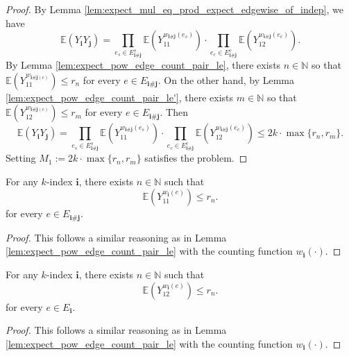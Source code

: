 \begin{proof}
  By Lemma \ref{lem:expect_mul_eq_prod_expect_edgewise_of_indep}, we have
  \[
  \mathbb{E} (Y_\mathbf{i}Y_\mathbf{j}) 
  = \prod_{e_s \in E^s_{\mathbf{i} \# \mathbf{j}}} \mathbb{E} (Y_{11}^{w_{\mathbf{i} \# \mathbf{j}}(e_s)}) \cdot \prod_{e_c \in E^c_{\mathbf{i} \# \mathbf{j}}} \mathbb{E} (Y_{12}^{w_{\mathbf{i} \# \mathbf{j}}(e_c)}).
  \]
  By Lemma \ref{lem:expect_pow_edge_count_pair_le}, there exists $n \in \mathbb{N}$ so that $\mathbb{E} (Y_{11}^{w_{\mathbf{i} \# \mathbf{j} (e)}}) \leq r_n$ for every $e \in E_{\mathbf{i} \# \mathbf{j}}$. 
  On the other hand, by Lemma \ref{lem:expect_pow_edge_count_pair_le'}, there exists $m \in \mathbb{N}$ so that $\mathbb{E} (Y_{12}^{w_{\mathbf{i} \# \mathbf{j} (e)}}) \leq r_m$ for every $e \in E_{\mathbf{i} \# \mathbf{j}}$. 
  Then
  \[ \mathbb{E} (Y_\mathbf{i}Y_\mathbf{j}) 
  = \prod_{e_s \in E^s_{\mathbf{i} \# \mathbf{j}}} \mathbb{E} (Y_{11}^{w_{\mathbf{i} \# \mathbf{j}}(e_s)}) \cdot \prod_{e_c \in E^c_{\mathbf{i} \# \mathbf{j}}} \mathbb{E} (Y_{12}^{w_{\mathbf{i} \# \mathbf{j}}(e_c)})
  \leq 2k \cdot \max\{r_n,r_m\}.
  \]
  Setting $M_1 := 2k \cdot \max\{r_n,r_m\}$ satisfies the problem.
\end{proof}
\begin{lemma}
  \notready
  \label{lem:expect_pow_edge_count_le} 
  For any $k$-index $\mathbf{i}$, there exists $n \in \mathbb{N}$ such that
  \[
  \mathbb{E} (Y_{11}^{w_{\mathbf{i}}(e)}) \leq r_n.
  \]
  for every $e \in E_{\mathbf{i} \# \mathbf{j}}$.
\end{lemma}
\begin{proof}
  This follows a similar reasoning as in Lemma \ref{lem:expect_pow_edge_count_pair_le} with the counting function $w_\mathbf{i}(\cdot)$.
\end{proof}
\begin{lemma}
  \notready
  \label{lem:expect_pow_edge_count_le'} 
  For any $k$-index $\mathbf{i}$, there exists $n \in \mathbb{N}$ such that
  \[
  \mathbb{E} (Y_{12}^{w_{\mathbf{i}}(e)}) \leq r_n.
  \]
  for every $e \in E_\mathbf{i}$.
\end{lemma}
\begin{proof}
  This follows a similar reasoning as in Lemma \ref{lem:expect_pow_edge_count_pair_le} with the counting function $w_\mathbf{i}(\cdot)$.
\end{proof}
